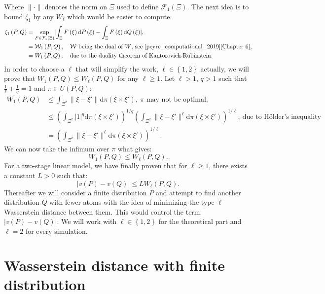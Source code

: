 \documentclass{amsart}
\begin{document}
Where $\lVert \cdot \rVert$ denotes the norm on $\Xi$ used to define $\mathcal{F}_1\left(\Xi\right)$. The next idea is to bound $\zeta_1$ by any $W_\ell$ which would be easier to compute.
\begin{align*}
    \zeta_1\left(P,Q\right)&= \sup_{F\in\mathcal{F}_1\left(\Xi\right)}\lvert \int_\Xi F\left(\xi\right)\text{d}P\left(\xi\right)-\int_\Xi F\left(\xi\right)\text{d}Q\left(\xi\right)\rvert, \\
    &=\mathcal{W}_1\left(P,Q\right), \quad \mathcal{W} \text{ being the dual of } W \text{, see \cite{peyre_computational_2019}[Chapter 6],}\\
    &= W_1\left(P,Q\right), \quad \text{due to the duality theorem of Kantorovich-Rubinstein.}
\end{align*}
In order to choose a $\ell$ that will simplify the work, $\ell\in\left\{1,2\right\}$ actually, we will prove that $W_1\left(P,Q\right)\leq W_\ell\left(P,Q\right)$ for any $\ell \geq 1$.  Let $\ell >1$, $q>1$ such that $\frac{1}{\ell}+\frac{1}{q}=1$ and $\pi\in U\left(P,Q\right)$:
\begin{align*}
W_1\left(P,Q\right)&\leq \int_{\Xi^2}\lVert \xi-\xi'\rVert \text{d}\pi\left(\xi\times\xi'\right),\: \pi \text{ may not be optimal,} \\ &\leq \left(\int_{\Xi^2} \lvert 1\rvert^{q}\text{d}\pi\left(\xi\times\xi'\right)\right)^{1/q} \left(\int_{\Xi^2}\lVert \xi-\xi'\rVert^\ell\text{d}\pi\left(\xi\times\xi'\right)\right)^{1/\ell}, \: \text{due to Hölder's inequality} \\
&=\left(\int_{\Xi^2}\lVert \xi-\xi'\rVert^\ell\text{d}\pi\left(\xi\times\xi'\right)\right)^{1/\ell}.
\end{align*}
We can now take the infimum over $\pi$ what gives:
$$
W_1\left(P,Q\right)\leq W_\ell\left(P,Q\right).
$$
For a two-stage linear model, we have finally proven that for $\ell\geq1$, there exists a constant $L>0$ such that:
$$
\lvert v\left(P\right)-v\left(Q\right)\rvert \leq LW_\ell\left(P,Q\right).
$$
Thereafter we will consider a finite distribution $P$ and attempt to find another distribution $Q$ with fewer atoms with the idea of minimizing the type-$\ell$ Wasserstein distance between them. This would control the term: $\lvert v\left(P\right)-v\left(Q\right)\rvert$. We will work with $\ell\in\left\{1,2\right\}$ for the theoretical part and $\ell=2$ for every simulation.

\section{Wasserstein distance with finite distribution}
\end{document}
